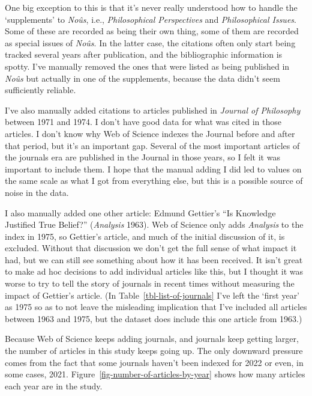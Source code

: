 \documentclass[
  10pt,
  letterpaper,
  DIV=11,
  numbers=noendperiod,
  twoside]{scrartcl}
\begin{document}
One big exception to this is that it's never really understood how to
handle the `supplements' to \emph{Noûs}, i.e., \emph{Philosophical
Perspectives} and \emph{Philosophical Issues}. Some of these are
recorded as being their own thing, some of them are recorded as special
issues of \emph{Noûs}. In the latter case, the citations often only
start being tracked several years after publication, and the
bibliographic information is spotty. I've manually removed the ones that
were listed as being published in \emph{Noûs} but actually in one of the
supplements, because the data didn't seem sufficiently reliable.

I've also manually added citations to articles published in
\emph{Journal of Philosophy} between 1971 and 1974. I don't have good
data for what was cited in those articles. I don't know why Web of
Science indexes the Journal before and after that period, but it's an
important gap. Several of the most important articles of the journals
era are published in the Journal in those years, so I felt it was
important to include them. I hope that the manual adding I did led to
values on the same scale as what I got from everything else, but this is
a possible source of noise in the data.

I also manually added one other article: Edmund Gettier's ``Is Knowledge
Justified True Belief?'' (\emph{Analysis} 1963). Web of Science only
adds \emph{Analysis} to the index in 1975, so Gettier's article, and
much of the initial discussion of it, is excluded. Without that
discussion we don't get the full sense of what impact it had, but we can
still see something about how it has been received. It isn't great to
make ad hoc decisions to add individual articles like this, but I
thought it was worse to try to tell the story of journals in recent
times without measuring the impact of Gettier's article. (In
Table~\ref{tbl-list-of-journals} I've left the `first year' as 1975 so
as to not leave the misleading implication that I've included all
articles between 1963 and 1975, but the dataset does include this one
article from 1963.)

Because Web of Science keeps adding journals, and journals keep getting
larger, the number of articles in this study keeps going up. The only
downward pressure comes from the fact that some journals haven't been
indexed for 2022 or even, in some cases, 2021.
Figure~\ref{fig-number-of-articles-by-year} shows how many articles each
year are in the study.
\end{document}
